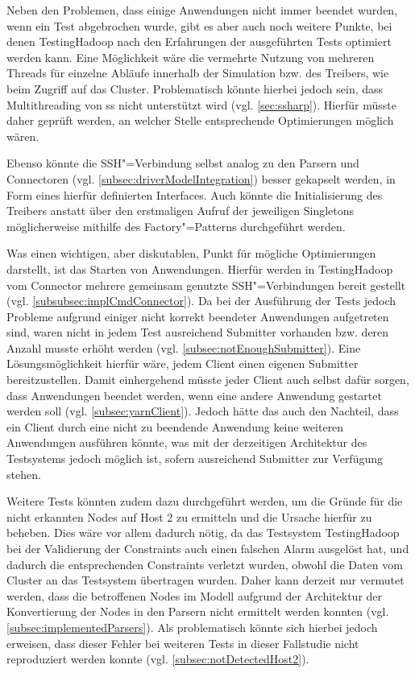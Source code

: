 Neben den Problemen, dass einige Anwendungen nicht immer beendet wurden, wenn ein Test abgebrochen wurde, gibt es aber auch noch weitere Punkte, bei denen TestingHadoop nach den Erfahrungen der ausgeführten Tests optimiert werden kann.
Eine Möglichkeit wäre \zB die vermehrte Nutzung von mehreren Threads für einzelne Abläufe innerhalb der Simulation bzw. des Treibers, wie beim Zugriff auf das Cluster.
Problematisch könnte hierbei jedoch sein, dass Multithreading von \gls{ss} nicht unterstützt wird (vgl. \cref{sec:ssharp}).
Hierfür müsste daher geprüft werden, an welcher Stelle entsprechende Optimierungen möglich wären.

Ebenso könnte die SSH"=Verbindung selbst analog zu den Parsern und Connectoren (vgl. \cref{subsec:driverModelIntegration}) besser gekapselt werden, \zB in Form eines hierfür definierten Interfaces.
Auch könnte die Initialisierung des Treibers anstatt über den erstmaligen Aufruf der jeweiligen Singletons möglicherweise mithilfe des Factory"=Patterns durchgeführt werden.

Was einen wichtigen, aber diskutablen, Punkt für mögliche Optimierungen darstellt, ist das Starten von Anwendungen.
Hierfür werden in TestingHadoop vom Connector mehrere gemeinsam genutzte SSH"=Verbindungen bereit gestellt (vgl. \cref{subsubsec:implCmdConnector}).
Da bei der Ausführung der Tests jedoch Probleme aufgrund einiger nicht korrekt beendeter Anwendungen aufgetreten sind, waren nicht in jedem Test ausreichend Submitter vorhanden bzw. deren Anzahl musste erhöht werden (vgl. \cref{subsec:notEnoughSubmitter}).
Eine Lösungsmöglichkeit hierfür wäre, jedem Client einen eigenen Submitter bereitzustellen.
Damit einhergehend müsste jeder Client auch selbst dafür sorgen, dass Anwendungen beendet werden, wenn eine andere Anwendung gestartet werden soll (vgl. \cref{subsec:yarnClient}).
Jedoch hätte das auch den Nachteil, dass ein Client durch eine nicht zu beendende Anwendung keine weiteren Anwendungen ausführen könnte, was mit der derzeitigen Architektur des Testsystems jedoch möglich ist, sofern ausreichend Submitter zur Verfügung stehen.

Weitere Tests könnten zudem dazu durchgeführt werden, um die Gründe für die nicht erkannten Nodes auf Host 2 zu ermitteln und die Ursache hierfür zu beheben.
Dies wäre vor allem dadurch nötig, da das Testsystem TestingHadoop bei der Validierung der Constraints auch einen falschen Alarm ausgelöst hat, und dadurch die entsprechenden Constraints verletzt wurden, obwohl die Daten vom Cluster an das Testsystem übertragen wurden.
Daher kann derzeit nur vermutet werden, dass die betroffenen Nodes im Modell aufgrund der Architektur der Konvertierung der Nodes in den Parsern nicht ermittelt werden konnten (vgl. \cref{subsec:implementedParsers}).
Als problematisch könnte sich hierbei jedoch erweisen, dass dieser Fehler bei weiteren Tests in dieser Fallstudie nicht reproduziert werden konnte (vgl. \cref{subsec:notDetectedHost2}).

